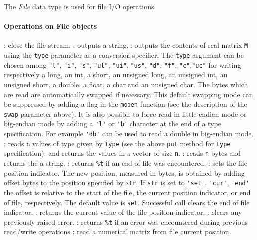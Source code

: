 \begin{mandescription}
The \emph{File} data type is used for file I/O operations.
\end{mandescription}

\paragraph{Operations on File objects}
\begin{itemize}
  : close the file stream.
  : outputs a string. 
  : outputs the contents of real matrix \verb+M+ using 
  the \verb!type! parameter as a conversion specifier. The \verb+type+ argument can be chosen 
  among \verb+"l"+, \verb+"i"+, \verb+"s"+, \verb+"ul"+, \verb+"ui"+, \verb+"us"+, \verb+"d"+, \verb+"f"+, 
  \verb+"c"+,\verb+"uc"+ for writing respectively a long, an int, a short, an unsigned long, 
  an unsigned int, an unsigned short, a double, a float, a char and an unsigned char. 
  The bytes which are read are automatically swapped if necessary. 
  This default swapping mode can be suppressed by adding a flag in the \verb!mopen! function 
  (see the description of the \verb+swap+ parameter above).
  It is also possible to force read in little-endian mode or big-endian mode by adding a \verb+'l'+ or \verb+'b'+  
  character at the end of a type specification. For example \verb+'db'+ can be used to read a double 
  in big-endian mode. 
  : reads \verb+n+ values of type given by \verb+type+ 
  (see the above \verb+put+ method for \verb+type+ specification).
  and returns the values in a vector of size \verb+n+. 
  : reads \verb+n+ bytes and returns the a string.
  : returns \verb+%t+ if an end-of-file was encountered. 
  :  sets  the  file  position indicator. The new position, 
  measured in bytes, is obtained by adding offset bytes to  the
  position  specified by \verb+str+. If \verb+str+ is set to \verb+'set'+, \verb+'cur'+, 
  \verb+'end'+ the offset is relative to the start of the file, 
  the current position indicator, or  end of file,  respectively. The default value 
  is \verb+set+.
  Successful call clears the end of file indicator.
  : returns the current value of the file position indicator. 
  : clears any previously raised error.
  : returns \verb+%t+ if an error was encountered during previous read/write 
  operations 
  : read a numerical matrix from file current position. 

\end{itemize}
